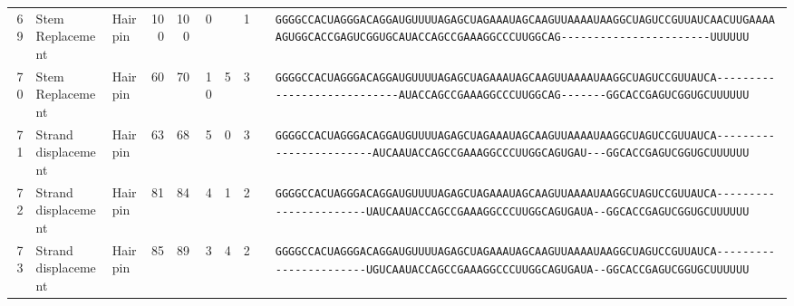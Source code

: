 \begin{tabular}{rllrrrrrcl}
 69 & Stem Replacement & Hairpin & 100 & 100 & 0 &  & 1 &  &
 \color{ucsfdarkgrey}\verb|GGGGCCACUAGGGACAGGAU|\color{ucsforange}\verb|GUUUUA|\color{ucsfblue}\verb|GAGCUAGAAAUAGCAAGU|\color{ucsforange}\verb|UAAAAUAA|\color{ucsfnavy}\verb|GGCUAGUCCGU|\color{ucsforange}\verb|UAUCA|\color{ucsfteal}\verb|ACUUGAAAAAGUG|\color{ucsforange}\verb|GCACCGAGUCGGUGC|\color{ucsfpurple}\verb|AUACCAGCCGAAAGGCCCUUGGCAG|\color{ucsforange}\verb|-----------------------UUUUUU| \\

 70 & Stem Replacement & Hairpin & 60 & 70 & 10 & 5 & 3 &  &
 \color{ucsfdarkgrey}\verb|GGGGCCACUAGGGACAGGAU|\color{ucsforange}\verb|GUUUUA|\color{ucsfblue}\verb|GAGCUAGAAAUAGCAAGU|\color{ucsforange}\verb|UAAAAUAA|\color{ucsfnavy}\verb|GGCUAGUCCGU|\color{ucsforange}\verb|UAUCA|\color{ucsfteal}\verb|----------------------------|\color{ucsfpurple}\verb|AUACCAGCCGAAAGGCCCUUGGCAG|\color{ucsfteal}\verb|-------G|\color{ucsforange}\verb|GCACCGAGUCGGUGCUUUUUU| \\

 71 & Strand displacement & Hairpin & 63 & 68 & 5 & 0 & 3 &  &
 \color{ucsfdarkgrey}\verb|GGGGCCACUAGGGACAGGAU|\color{ucsforange}\verb|GUUUUA|\color{ucsfblue}\verb|GAGCUAGAAAUAGCAAGU|\color{ucsforange}\verb|UAAAAUAA|\color{ucsfnavy}\verb|GGCUAGUCCGU|\color{ucsforange}\verb|UAUCA|\color{ucsfteal}\verb|------------------------AUCA|\color{ucsfpurple}\verb|AUACCAGCCGAAAGGCCCUUGGCAG|\color{ucsfteal}\verb|UGAU---G|\color{ucsforange}\verb|GCACCGAGUCGGUGCUUUUUU| \\

 72 & Strand displacement & Hairpin & 81 & 84 & 4 & 1 & 2 &  &
 \color{ucsfdarkgrey}\verb|GGGGCCACUAGGGACAGGAU|\color{ucsforange}\verb|GUUUUA|\color{ucsfblue}\verb|GAGCUAGAAAUAGCAAGU|\color{ucsforange}\verb|UAAAAUAA|\color{ucsfnavy}\verb|GGCUAGUCCGU|\color{ucsforange}\verb|UAUCA|\color{ucsfteal}\verb|-----------------------UAUCA|\color{ucsfpurple}\verb|AUACCAGCCGAAAGGCCCUUGGCAG|\color{ucsfteal}\verb|UGAUA--G|\color{ucsforange}\verb|GCACCGAGUCGGUGCUUUUUU| \\

 73 & Strand displacement & Hairpin & 85 & 89 & 3 & 4 & 2 &  &
 \color{ucsfdarkgrey}\verb|GGGGCCACUAGGGACAGGAU|\color{ucsforange}\verb|GUUUUA|\color{ucsfblue}\verb|GAGCUAGAAAUAGCAAGU|\color{ucsforange}\verb|UAAAAUAA|\color{ucsfnavy}\verb|GGCUAGUCCGU|\color{ucsforange}\verb|UAUCA|\color{ucsfteal}\verb|-----------------------UGUCA|\color{ucsfpurple}\verb|AUACCAGCCGAAAGGCCCUUGGCAG|\color{ucsfteal}\verb|UGAUA--G|\color{ucsforange}\verb|GCACCGAGUCGGUGCUUUUUU| \\


\end{tabular}
